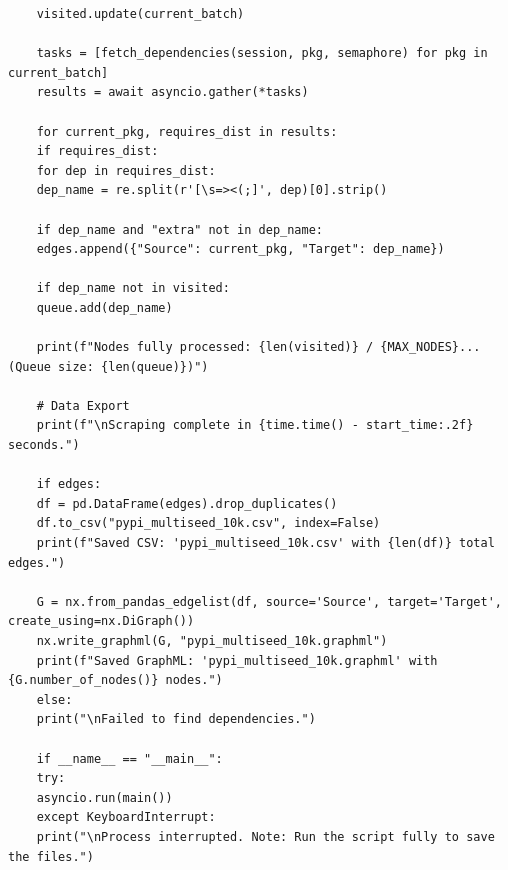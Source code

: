 \documentclass[12pt,a4paper]{article}
\begin{document}
\begin{lstlisting}
	visited.update(current_batch)
	
	tasks = [fetch_dependencies(session, pkg, semaphore) for pkg in current_batch]
	results = await asyncio.gather(*tasks)
	
	for current_pkg, requires_dist in results:
	if requires_dist:
	for dep in requires_dist:
	dep_name = re.split(r'[\s=><(;]', dep)[0].strip()
	
	if dep_name and "extra" not in dep_name:
	edges.append({"Source": current_pkg, "Target": dep_name})
	
	if dep_name not in visited:
	queue.add(dep_name)
	
	print(f"Nodes fully processed: {len(visited)} / {MAX_NODES}... (Queue size: {len(queue)})")
	
	# Data Export
	print(f"\nScraping complete in {time.time() - start_time:.2f} seconds.")
	
	if edges:
	df = pd.DataFrame(edges).drop_duplicates()
	df.to_csv("pypi_multiseed_10k.csv", index=False)
	print(f"Saved CSV: 'pypi_multiseed_10k.csv' with {len(df)} total edges.")
	
	G = nx.from_pandas_edgelist(df, source='Source', target='Target', create_using=nx.DiGraph())
	nx.write_graphml(G, "pypi_multiseed_10k.graphml")
	print(f"Saved GraphML: 'pypi_multiseed_10k.graphml' with {G.number_of_nodes()} nodes.")
	else:
	print("\nFailed to find dependencies.")
	
	if __name__ == "__main__":
	try:
	asyncio.run(main())
	except KeyboardInterrupt:
	print("\nProcess interrupted. Note: Run the script fully to save the files.")
\end{lstlisting}
\end{document}
